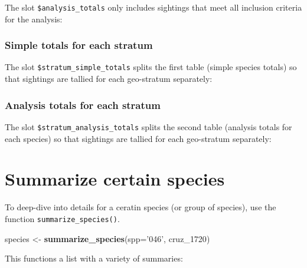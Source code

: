 \documentclass[
]{book}
\newenvironment{Shaded}{\begin{snugshade}}{\end{snugshade}}
\newcommand{\DataTypeTok}[1]{\textcolor[rgb]{0.13,0.29,0.53}{#1}}
\newcommand{\DecValTok}[1]{\textcolor[rgb]{0.00,0.00,0.81}{#1}}
\newcommand{\KeywordTok}[1]{\textcolor[rgb]{0.13,0.29,0.53}{\textbf{#1}}}
\newcommand{\NormalTok}[1]{#1}
\newcommand{\OperatorTok}[1]{\textcolor[rgb]{0.81,0.36,0.00}{\textbf{#1}}}
\newcommand{\StringTok}[1]{\textcolor[rgb]{0.31,0.60,0.02}{#1}}
\begin{document}
The slot \texttt{\$analysis\_totals} only includes sightings that meet all inclusion criteria for the analysis:

\hypertarget{simple-totals-for-each-stratum}{%
\subsubsection*{Simple totals for each stratum}\label{simple-totals-for-each-stratum}}

The slot \texttt{\$stratum\_simple\_totals} splits the first table (simple species totals) so that sightings are tallied for each geo-stratum separately:

\hypertarget{analysis-totals-for-each-stratum}{%
\subsubsection*{Analysis totals for each stratum}\label{analysis-totals-for-each-stratum}}

The slot \texttt{\$stratum\_analysis\_totals} splits the second table (analysis totals for each species) so that sightings are tallied for each geo-stratum separately:

\hypertarget{summarize-certain-species}{%
\section*{Summarize certain species}\label{summarize-certain-species}}

To deep-dive into details for a ceratin species (or group of species), use the function \texttt{summarize\_species()}.

\begin{Shaded}
\begin{Highlighting}[]
\NormalTok{species <-}\StringTok{ }\KeywordTok{summarize_species}\NormalTok{(}\DataTypeTok{spp=}\StringTok{'046'}\NormalTok{, cruz_}\DecValTok{1720}\NormalTok{)}
\end{Highlighting}
\end{Shaded}

This functions a list with a variety of summaries:

\begin{Shaded}
\end{Shaded}
\end{document}
